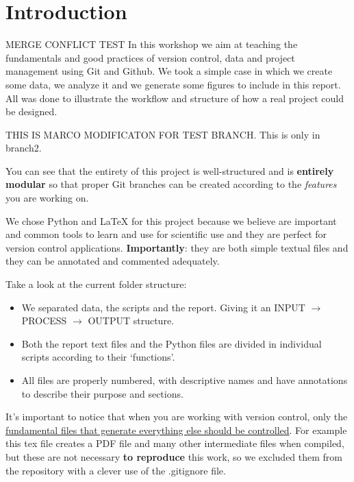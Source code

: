 \section{Introduction}

MERGE CONFLICT TEST In this workshop we aim at teaching the fundamentals and good practices of version control, data and project management using Git and Github. We took a simple case in which we create some data, we analyze it and we generate some figures to include in this report. All was done to illustrate the workflow and structure of how a real project could be designed.

THIS IS MARCO MODIFICATON FOR TEST BRANCH. This is only in branch2.

You can see that the entirety of this project is well-structured and is \textbf{entirely modular} so that proper Git branches can be created according to the \textit{features} you are working on.

We chose Python and \LaTeX\xspace for this project because we believe are important and common tools to learn and use for scientific use and they are perfect for version control applications. \textbf{Importantly}: they are both simple textual files and they can be annotated and commented adequately.

Take a look at the current folder structure:

\begin{itemize}
    \item We separated data, the scripts and the report. Giving it an INPUT $\rightarrow$ PROCESS $\rightarrow$ OUTPUT structure.
    \item Both the report text files and the Python files are divided in individual scripts according to their `functions'.
    \item All files are properly numbered, with descriptive names and have annotations to describe their purpose and sections.
\end{itemize}

It's important to notice that when you are working with version control, only the \underline{fundamental files that generate everything else should be controlled}. For example this tex file creates a PDF file and many other intermediate files when compiled, but these are not necessary \textbf{to reproduce} this work, so we excluded them from the repository with a clever use of the .gitignore file.